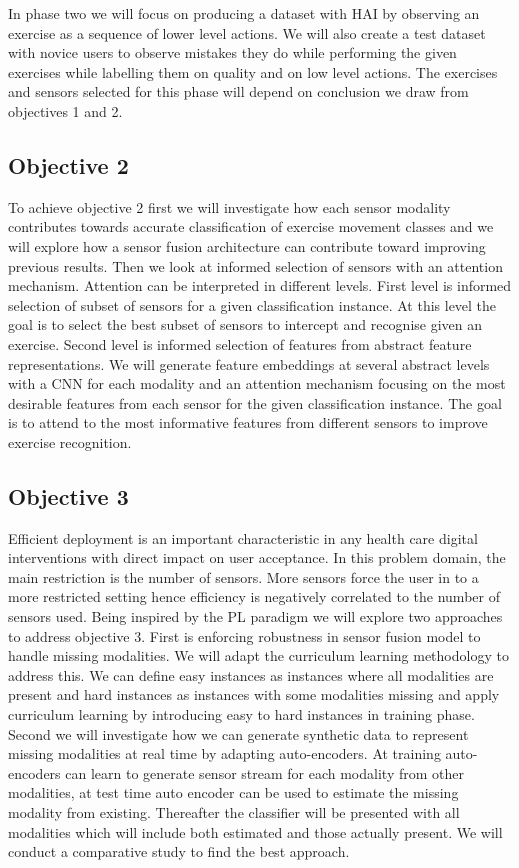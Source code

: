 In phase two we will focus on producing a dataset with HAI by observing an exercise as a sequence of lower level actions. We will also create a test dataset with novice users to observe mistakes they do while performing the given exercises while labelling them on quality and on low level actions. The exercises and sensors selected for this phase will depend on conclusion we draw from objectives 1 and 2. 

\subsection{Objective 2}
To achieve objective 2 first we will investigate how each sensor modality contributes towards accurate classification of exercise movement classes and we will explore how a sensor fusion architecture can contribute toward improving previous results. Then we look at informed selection of sensors with an attention mechanism. Attention can be interpreted in different levels. First level is informed selection of subset of sensors for a given classification instance. At this level the goal is to select the best subset of sensors to intercept and recognise given an exercise. Second level is informed selection of features from abstract feature representations. We will generate feature embeddings at several abstract levels with a CNN for each modality and an attention mechanism focusing on the most desirable features from each sensor for the given classification instance. The goal is to attend to the most informative features from different sensors to improve exercise recognition.

\subsection{Objective 3}
Efficient deployment is an important characteristic in any health care digital interventions with direct impact on user acceptance. In this problem domain, the main restriction is the number of sensors. More sensors force the user in to a more restricted setting hence efficiency is negatively correlated to the number of sensors used. Being inspired by the PL paradigm we will explore two approaches to address objective 3. First is enforcing robustness in sensor fusion model to handle missing modalities. We will adapt the curriculum learning methodology to address this. We can define easy instances as instances where all modalities are present and hard instances as instances with some modalities missing and apply curriculum learning by introducing easy to hard instances in training phase. Second we will investigate how we can generate synthetic data to represent missing modalities at real time by adapting auto-encoders. At training auto-encoders can learn to generate sensor stream for each modality from other modalities, at test time auto encoder can be used to estimate the missing modality from existing. Thereafter the classifier will be presented with all modalities which will include both estimated and those actually present. We will conduct a comparative study to find the best approach. 

